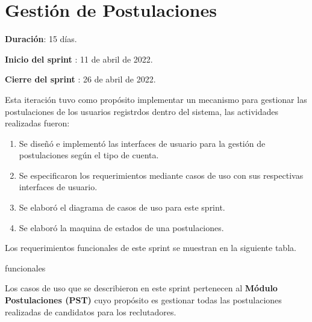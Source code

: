 \clearpage
\section{Gestión de Postulaciones}
    \begin{description}
        \item \textbf{Duración}: 15 días.
        \item \textbf{Inicio del sprint }: 11 de abril de 2022.
        \item \textbf{Cierre del sprint }: 26 de abril de 2022.
    \end{description}

Esta iteración tuvo como propósito implementar un mecanismo para gestionar las postulaciones de los usuarios registrdos dentro del 
sistema, las actividades realizadas fueron:
\begin{enumerate}
    \item Se diseñó e implementó las interfaces de usuario para la gestión de postulaciones según el tipo de cuenta.
    \item Se especificaron los requerimientos mediante casos de uso con sus respectivas interfaces de usuario.
    \item Se elaboró el diagrama de casos de uso para este sprint.
    \item Se elaboró la maquina de estados de una postulaciones.
\end{enumerate} 

Los requerimientos funcionales de este sprint se muestran en la siguiente tabla.
\begin{requerimientos}{funcionales}
        
\end{requerimientos}
Los casos de uso que se describieron en este sprint pertenecen al \textbf{Módulo Postulaciones (PST)} cuyo propósito es gestionar
todas las postulaciones realizadas de candidatos para los reclutadores.

